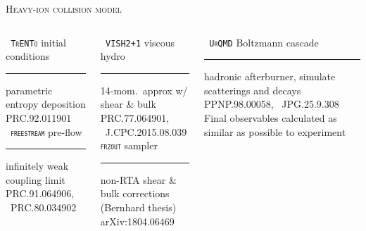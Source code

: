 \documentclass[aspectratio=169]{beamer}
\begin{document}
\begin{frame}[t]{\scshape Heavy-ion collision model}
  \centering
  \medskip
  \begin{columns}[T]
    \begin{column}{0.3\textwidth}
      \texttt{\scshape\color{theme} TrENTo} {\small initial conditions}\\
      \smallskip\hrule\medskip
      {\scriptsize parametric entropy deposition}\\
      {\tiny \color{theme}PRC.92.011901}\\[2ex]
      \texttt{\scshape\color{theme} freestream} {\small pre-flow}\\
      \smallskip\hrule\medskip
      {\scriptsize infinitely weak coupling limit}\\
      {\tiny \color{theme} PRC.91.064906, ~PRC.80.034902}
    \end{column}
    \hfill
    \begin{column}{0.3\textwidth}
      \texttt{\scshape\color{theme} VISH2+1} {\small viscous hydro}\\
      \smallskip\hrule\medskip
      {\scriptsize 14-mom.\ approx w/ shear \& bulk}\\
      {\tiny \color{theme} PRC.77.064901, ~J.CPC.2015.08.039}\\[2ex]
      \texttt{\scshape\color{theme}frzout} {\small sampler}\\
      \smallskip\hrule\medskip
      {\scriptsize non-RTA shear \& bulk corrections}\\
      {\tiny \color{theme} (Bernhard thesis) arXiv:1804.06469}
    \end{column}
    \hfill
    \begin{column}{0.3\textwidth}
      \texttt{\scshape\color{theme} UrQMD} {\small Boltzmann cascade}
      \smallskip\hrule\medskip
      {\scriptsize hadronic afterburner, simulate scatterings and decays}\\
      {\tiny\color{theme} PPNP.98.00058, ~JPG.25.9.308}\\[2ex]
      {\scriptsize Final observables calculated as similar as possible to experiment}
    \end{column}
  \end{columns}
\end{frame}
\end{document}
